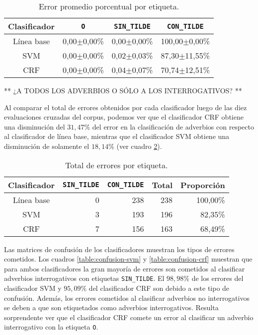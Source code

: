 \documentclass[runningheads,a4paper]{llncs}
\begin{document}
\begin{table}[ht]
 	\renewcommand{\arraystretch}{1.3}
	\renewcommand{\tabcolsep}{3pt}
	\caption{Error promedio porcentual por etiqueta.}
	\label{table:evaluacion-promedio}
	\centering
	\begin{tabular}{c r r r}
		\hline\hline
		\multicolumn{1}{c}{\textbf{Clasificador}} 
			& \multicolumn{1}{c}{\textbf{\texttt{O}}}
			& \multicolumn{1}{c}{\textbf{\texttt{SIN\_TILDE}}}
			& \multicolumn{1}{c}{\textbf{\texttt{CON\_TILDE}}} \\
		\hline
		Línea base & 0,00$\pm$0,00\% & 0,00$\pm$0,00\% & 100,00$\pm$0,00\% \\
		SVM        & 0,00$\pm$0,00\% & 0,02$\pm$0,03\% &  87,30$\pm$11,55\% \\
		CRF        & 0,00$\pm$0,00\% & 0,04$\pm$0,07\% &  70,74$\pm$12,51\% \\
		\hline
	\end{tabular}
\end{table}

** ¿A TODOS LOS ADVERBIOS O SÓLO A LOS INTERROGATIVOS? **

Al comparar el total de errores obtenidos por cada clasificador luego de las diez  evaluaciones cruzadas del corpus, podemos ver que el clasificador CRF obtiene una disminución del $31,47\%$ del error en la clasificación de adverbios con respecto al clasificador de línea base, mientras que el clasificador SVM obtiene una disminución de solamente el $18,14\%$ (ver cuadro \ref{table:evaluacion-total}).

\begin{table}[ht]
 	\renewcommand{\arraystretch}{1.3}
	\renewcommand{\tabcolsep}{3pt}
	\caption{Total de errores por etiqueta.}
	\label{table:evaluacion-total}
	\centering
	\begin{tabular}{c r r r r}
		\hline\hline
		\multicolumn{1}{c}{\textbf{Clasificador}} 
			& \multicolumn{1}{c}{\textbf{\texttt{SIN\_TILDE}}}
			& \multicolumn{1}{c}{\textbf{\texttt{CON\_TILDE}}} 
			& \multicolumn{1}{c}{\textbf{Total}} 
			& \multicolumn{1}{c}{\textbf{Proporci\'on}} \\
		\hline
		Línea base 	& 0 & 238 & 238 & 100,00\% \\
		SVM 		& 3 & 193 & 196 &  82,35\% \\
		CRF 		& 7 & 156 & 163 &  68,49\% \\
		\hline
	\end{tabular}
\end{table}

Las matrices de confusi\'on de los clasificadores muestran los tipos de errores cometidos. Los cuadros \ref{table:confusion-svm} y \ref{table:confusion-crf} muestran que para ambos clasificadores la gran mayor\'ia de errores son cometidos al clasificar adverbios interrogativos con etiquetas \texttt{\small SIN\_TILDE}. El $98,98\%$ de los errores del clasificador SVM y $95,09\%$ del clasificador CRF son debido a este tipo de confusi\'on. Además, los errores cometidos al clasificar adverbios no interrogativos se deben a que son etiquetados como adverbios interrogativos. Resulta sorprendente ver que el clasificador CRF comete un error al clasificar un adverbio interrogativo con la etiqueta \texttt{\small O}.
\end{document}

